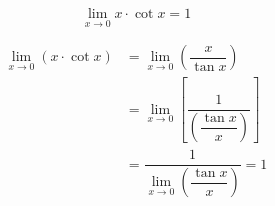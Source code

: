 \documentclass[14pt,fleqn]{extarticle}
\begin{document}
 

\[ \lim_{x\to 0}x\cdot\cot x = 1 \]

\newcard 

\begin{align}
\lim_{x\to 0}\left( x\cdot \cot x\right) &= \lim_{x\to 0}\left(\dfrac{x}{\tan x}\right) \\
&= \lim_{x\to 0}\left[ \dfrac{1}{\left(\dfrac{\tan x}{x}\right)}\right] \\
&= \dfrac{1}{\lim_{x\to 0}\left(\dfrac{\tan x}{x}\right)} = 1
\end{align}
\end{document}
